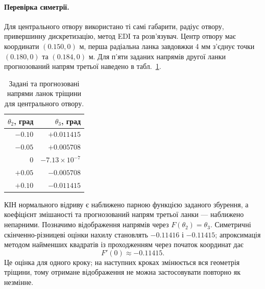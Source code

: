 \documentclass[a4paper,12pt]{article}
\begin{document}
\paragraph{Перевірка симетрії.}
Для центрального отвору використано ті самі габарити, радіус отвору, привершинну дискретизацію,
метод EDI та розв’язувач. Центр отвору має координати $(0.150,0)$ м, перша радіальна ланка
завдовжки 4 мм з’єднує точки $(0.180,0)$ та $(0.184,0)$ м.
Для п’яти заданих напрямів другої ланки прогнозований напрям третьої наведено
в табл.~\ref{tab:symmetric-stability}.
\begin{table}[htbp]
\centering
\small
\caption{Задані та прогнозовані напрями ланок тріщини для центрального отвору.}
\label{tab:symmetric-stability}
\begin{tabular*}{0.64\linewidth}{@{\extracolsep{\fill}}rr}
\toprule
$\theta_2$, град & $\theta_3$, град\\
\midrule
$-0.10$ & $+0.011415$\\
$-0.05$ & $+0.005708$\\
$0$     & $-7.13\times10^{-7}$\\
$+0.05$ & $-0.005708$\\
$+0.10$ & $-0.011415$\\
\bottomrule
\end{tabular*}
\end{table}
КІН нормального відриву є наближено парною функцією заданого збурення, а коефіцієнт змішаності
та прогнозований напрям третьої ланки --- наближено непарними.
Позначимо відображення напрямів через $F(\theta_2)=\theta_3$.
Симетричні скінченно-різницеві оцінки нахилу становлять $-0.11416$ і $-0.11415$;
апроксимація методом найменших квадратів із проходженням через початок координат дає
\[
 F'(0)\approx-0.11415.
\]
Це оцінка для одного кроку; на наступних кроках змінюється вся геометрія тріщини,
тому отримане відображення не можна застосовувати повторно як незмінне.
\end{document}
